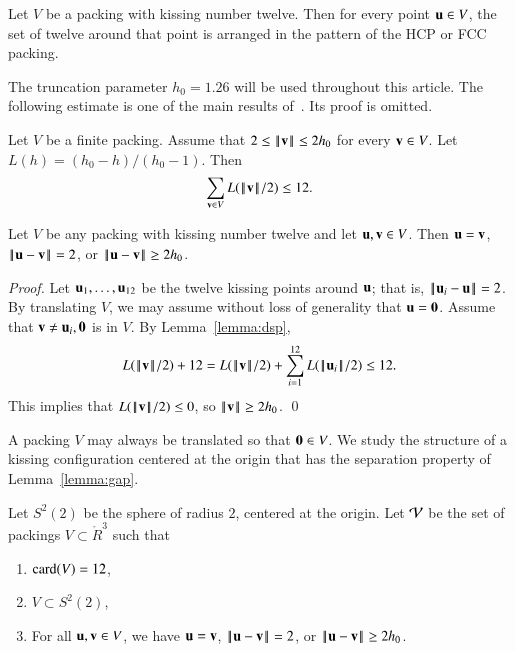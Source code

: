 \documentclass{llncs}
\begin{document}
%


\begin{theorem}\label{thm:fc} 
  Let $V$ be a packing with kissing number twelve.  Then for every point $\u\in
  V$, the set of twelve around that point is arranged in the pattern
  of the HCP or FCC packing.
\end{theorem}
%
%
%

The truncation parameter $h_0=1.26$ will be used throughout this article.
The following estimate is one of the main results of~\cite{DSP}.  Its proof
is omitted.

\begin{lemma}\label{lemma:dsp}
Let $V$ be a finite packing.  Assume that $2\le \normo{\v}\le 2h_0$ for
every $\v\in V$.  Let $L(h) = (h_0-h)/(h_0-1)$.  Then
\begin{equation}\label{eqn:L}
\sum_{\v\in V} L(\normo{\v}/2) \le 12.
\end{equation}
\end{lemma}

\begin{lemma} \label{lemma:gap}
  Let $V$ be any packing with kissing number twelve and let $\u,\v\in V$.
  Then $\u=\v$, $\norm{\u}{\v}=2$, or $\norm{\u}{\v} \ge 2h_0$.
\end{lemma}


\begin{proof} Let $ \u_1,\ldots, \u_{12}$ be the twelve kissing points
  around $\u$; that is, $\norm{\u_i}{\u}=2$.  
By translating $V$, we may assume without
loss of generality that $\u=\orz$.  Assume that $\v\ne \u_i,\orz$ is in $V$.   
By Lemma~\ref{lemma:dsp},
\[
   L(\normo{\v}/2)  + 12 
  =  L(\normo{\v}/2) + \sum_{i=1}^{12} L(\normo{\u_i}/2)  \le 12.
\]
This implies that $L(\normo{\v}/2)\le 0$, so $\normo{ \v}\ge 2h_0$.
\qed
\end{proof}

A packing $V$ may always be translated so that $\orz\in V$.  We study
the structure of a kissing configuration centered at the origin that
has the separation property of Lemma~\ref{lemma:gap}.

\begin{definition}[$S^2(2)$,~$\CalV$]
  Let $S^2(2)$ be the sphere of radius $2$, centered at the origin.  Let
  $\CalV$ be the set of packings $V\subset \ring{R}^3$ such that
\begin{enumerate}\wasitemize 
\item $\card(V) = 12$,
\item $V\subset S^2(2)$,
\item For all $\u,\v\in V$, we have $\u=\v$, $\norm{\u}{\v}=2$,
or $\norm{\u}{\v}\ge 2h_0$.
\end{enumerate}\wasitemize 
{}%
%
\end{definition}
\end{document}
